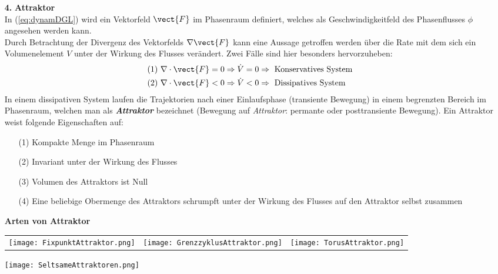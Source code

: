 \begin{itemize}
    \item[\textbf{4.}]\textbf{Attraktor}\\
    In (\ref{eq:dynamDGL}) wird ein Vektorfeld $\vect{F}$ im Phasenraum definiert, welches als Geschwindigkeitfeld des Phasenflusses $\phi$ angesehen werden kann.\\ Durch Betrachtung der Divergenz des Vektorfelds $\nabla\vect{F}$ kann eine Aussage getroffen werden über die Rate mit dem sich ein Volumenelement $V$ unter der Wirkung des Flusses verändert. Zwei Fälle sind hier besonders hervorzuheben:
    \begin{gather}
        \begin{aligned}
            (1)~&\nabla\cdot\vect{F}=0\Rightarrow \dot{V}=0 \Rightarrow~\text{Konservatives System}\\
            (2)~&\nabla\cdot\vect{F}<0\Rightarrow \dot{V}<0 \Rightarrow~\text{Dissipatives System}
        \end{aligned}
    \end{gather}
    In einem dissipativen System laufen die Trajektorien nach einer Einlaufsphase (transiente Bewegung) in einem begrenzten Bereich im Phasenraum, welchen man als \textit{\textbf{Attraktor}} bezeichnet (Bewegung auf \textit{Attraktor}: permante oder posttransiente Bewegung). Ein Attraktor weist folgende Eigenschaften auf:
    \begin{itemize}
        \item[(1)] Kompakte Menge im Phasenraum
        \item[(2)] Invariant unter der Wirkung des Flusses
        \item[(3)] Volumen des Attraktors ist Null
        \item[(4)] Eine beliebige Obermenge des Attraktors schrumpft unter der Wirkung des Flusses auf den Attraktor selbst zusammen   
    \end{itemize}
    \textbf{Arten von Attraktor}
    \begin{center}
        \begin{tabular}{ccc}
            \texttt{[image: FixpunktAttraktor.png]}
            & \texttt{[image: GrenzzyklusAttraktor.png]}
            & \texttt{[image: TorusAttraktor.png]}
        \end{tabular}
        \texttt{[image: SeltsameAttraktoren.png]}
    \end{center}
\end{itemize}

